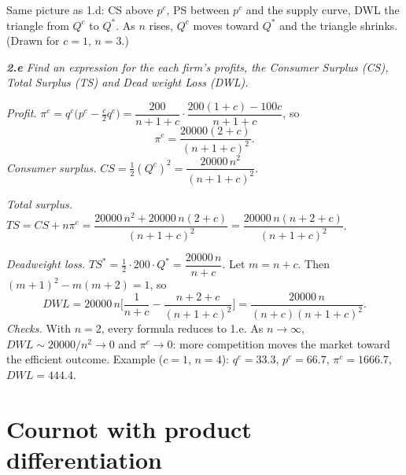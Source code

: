 \documentclass[11pt]{article}
\newcommand{\question}[1]{\par\smallskip\noindent\colorbox{black!6}{\parbox{\dimexpr\linewidth-2\fboxsep}{\itshape #1}}\par\smallskip}
\begin{document}
\begin{center}
\end{center}
Same picture as 1.d: CS above $p^c$, PS between $p^c$ and the supply curve, DWL the triangle from $Q^c$ to $Q^*$. As $n$ rises, $Q^c$ moves toward $Q^*$ and the triangle shrinks. (Drawn for $c=1$, $n=3$.)

\question{\textbf{2.e} Find an expression for the each firm's profits, the Consumer Surplus (CS), Total Surplus (TS) and Dead weight Loss (DWL).}

\emph{Profit.} $\pi^c=q^c\big(p^c-\tfrac{c}{2}q^c\big)=\dfrac{200}{n+1+c}\cdot\dfrac{200(1+c)-100c}{n+1+c}$, so
\[
\pi^c=\frac{20000(2+c)}{(n+1+c)^2}.
\]
\emph{Consumer surplus.} $CS=\tfrac12(Q^c)^2=\dfrac{20000\,n^2}{(n+1+c)^2}$.

\emph{Total surplus.} $TS=CS+n\pi^c=\dfrac{20000\,n^2+20000\,n(2+c)}{(n+1+c)^2}=\dfrac{20000\,n(n+2+c)}{(n+1+c)^2}$.

\emph{Deadweight loss.} $TS^*=\tfrac12\cdot200\cdot Q^*=\dfrac{20000\,n}{n+c}$. Let $m=n+c$. Then $(m+1)^2-m(m+2)=1$, so
\[
DWL=20000\,n\Big[\frac{1}{n+c}-\frac{n+2+c}{(n+1+c)^2}\Big]=\frac{20000\,n}{(n+c)(n+1+c)^2}.
\]
\emph{Checks.} With $n=2$, every formula reduces to 1.e. As $n\to\infty$, $DWL\sim20000/n^2\to0$ and $\pi^c\to0$: more competition moves the market toward the efficient outcome. Example ($c=1$, $n=4$): $q^c=33.3$, $p^c=66.7$, $\pi^c=1666.7$, $DWL=444.4$.

\section{Cournot with product differentiation}
\end{document}
